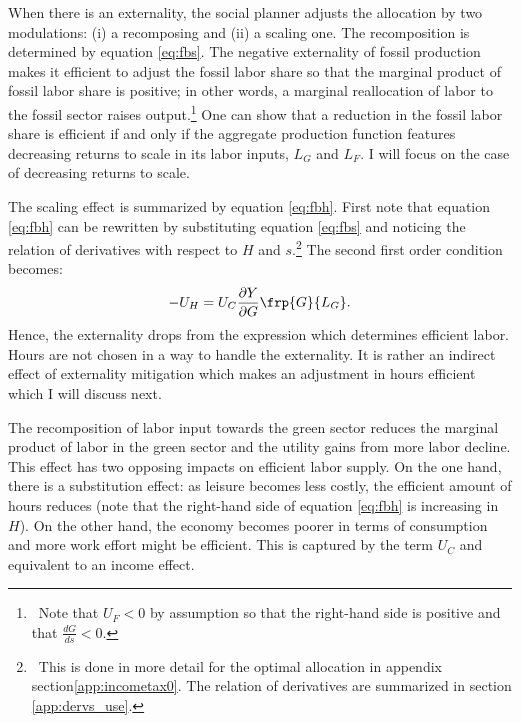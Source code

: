 When there is an externality, the social planner adjusts the allocation by two modulations: (i) a recomposing and (ii) a scaling one. 
The recomposition is determined by equation \ref{eq:fbs}.
The negative externality of fossil production makes it efficient to adjust the fossil labor share so that the marginal product of fossil labor share is positive; in other words, a marginal reallocation of labor to the fossil sector raises output.\footnote{\ Note that $U_F<0$ by assumption so that the right-hand side is positive and that $\frac{dG}{ds}<0$. }
One can show that a reduction in the fossil labor share is efficient if and only if the aggregate production function features decreasing returns to scale in its labor inputs, $L_G$ and $L_F$. I will focus on the case of decreasing returns to scale.
\begin{comment}
The equation 
\begin{align}
\frac{-U_F}{U_C \frac{dY}{dF}}=1+\frac{\frac{dY}{dG}\frac{dG}{ds}}{\frac{dY}{dF}\frac{dF}{ds}}.
\end{align}
The term on the left-hand side is the social cost of the externality: it measures what the representative household is willing to pay for a further reduction in fossil production. 
\end{comment}

The scaling effect is summarized by equation \ref{eq:fbh}.
First note that equation \ref{eq:fbh} can be rewritten by substituting equation \ref{eq:fbs} and noticing the relation of derivatives with respect to $H$ and $s$.\footnote{\ This is done in more detail for the optimal allocation in appendix section\ref{app:incometax0}. The relation of derivatives are summarized in section \ref{app:dervs_use}.}  
The second first order condition becomes:
\begin{align}\label{eq:fbh_simp}
-U_H=U_C\frac{\partial Y}{\partial G}\frp{G}{L_G}.
\end{align}
Hence, the externality drops from the expression which determines efficient labor. Hours are not chosen in a way to handle the externality. It is rather an indirect effect of externality mitigation which makes an adjustment in hours efficient which I will discuss next.

The recomposition of labor input towards the  green sector reduces the marginal product of labor in the green sector and the utility gains from more labor decline.  This effect has two opposing impacts on efficient labor supply. On the one hand, there is a substitution effect: as leisure becomes less costly, the efficient amount of hours reduces (note that the right-hand side of equation \ref{eq:fbh} is increasing in $H$). On the other hand, the economy becomes poorer in terms of consumption and more work effort might be efficient. This is captured by the term $U_C$ and equivalent to an income effect. 


